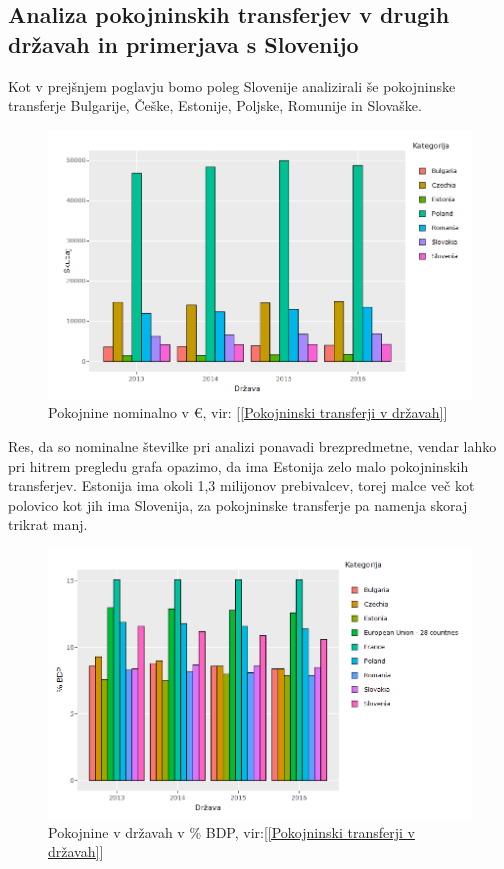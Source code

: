 \documentclass[12pt, a4paper]{article}
\begin{document}
\newpage
\subsection{Analiza pokojninskih transferjev v drugih državah in primerjava s Slovenijo}
Kot v prejšnjem poglavju bomo poleg Slovenije analizirali še pokojninske transferje Bulgarije, Češke, Estonije, Poljske, Romunije in Slovaške.

\begin{figure}[h!]
\centering
\includegraphics[width = 13 cm]{pokojnine_nominalno.png}
\caption{Pokojnine nominalno v \euro, vir: [\ref{Pokojninski transferji v državah}]}
\label{Slika 7}
\end{figure}

Res, da so nominalne številke pri analizi ponavadi brezpredmetne, vendar lahko pri hitrem pregledu grafa opazimo, da ima Estonija zelo malo pokojninskih transferjev. Estonija ima okoli 1,3 milijonov prebivalcev, torej malce več kot polovico kot jih ima Slovenija, za pokojninske transferje pa namenja skoraj trikrat manj. 

\begin{figure}[h!]
\centering
\includegraphics[width = 13 cm]{pokojnine_bdp.png}
\caption{Pokojnine v državah v \% BDP, vir:[\ref{Pokojninski transferji v državah}]}
\label{Slika 8}
\end{figure}
\end{document}
